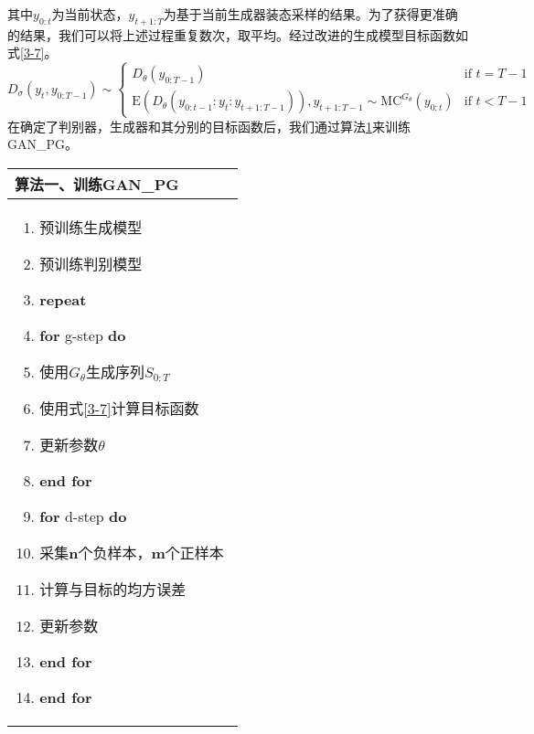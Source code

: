 \documentclass[]{template}
\begin{document}
其中$y_{0:t}$为当前状态，$y_{t+1:T}$为基于当前生成器装态采样的结果。为了获得更准确的结果，我们可以将上述过程重复数次，取平均。经过改进的生成模型目标函数如式\ref{3-7}。
\begin{equation}\label{3-7}
D_\sigma(y_t,y_{0:T-1})\sim 
\begin{cases}
    D_\theta(y_{0:T-1}) & \text{if } t =T-1 \\
    \mathrm{E}(D_\theta(y_{0:t-1}:y_t:y_{t+1:T-1})),y_{t+1:T-1}\sim \mathrm{MC}^{G_\theta}(y_{0:t}) & \text{if }t<T-1
\end{cases}
\end{equation}
在确定了判别器，生成器和其分别的目标函数后，我们通过算法\ref{s3-1}来训练GAN\_PG。
\linespread{0}
\begin{table}[htbp]
    \label{s3-1}
    \begin{center}
        \begin{tabular*}{.5\linewidth}{p{0.5\linewidth}}
\toprule
            算法一、训练GAN\_PG \\
\midrule
\begin{minipage}[t]{\linewidth}
\begin{enumerate}[itemsep=-2pt]
    \item 预训练生成模型
    \item 预训练判别模型
    \item \textbf{repeat}
    \item \quad \textbf{for} g-step \textbf{do}
    \item \quad \quad 使用$G_\theta$生成序列$S_{0:T}$
    \item \quad \quad 使用式\ref{3-7}计算目标函数
    \item \quad \quad 更新参数$\theta$
    \item \quad \textbf{end for}
    \item \quad \textbf{for} d-step \textbf{do}
    \item \quad \quad 采集\textbf{n}个负样本，\textbf{m}个正样本
    \item \quad \quad 计算与目标的均方误差
    \item \quad \quad 更新参数
    \item \quad \textbf{end for}  
    \item \textbf{end for}
\end{enumerate}
\end{minipage}\\
\bottomrule
        \end{tabular*}
    \end{center}
\end{table}
\linespread{1.3}
\end{document}
